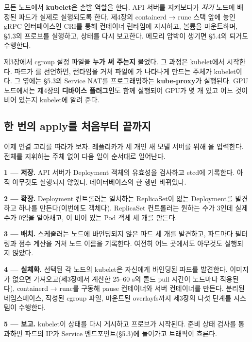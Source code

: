모든 노드에서 \textbf{kubelet}은 손발 역할을 한다. API 서버를 지켜보다가 \textit{자기} 노드에 배정된 파드가 실제로 실행되도록 한다. 제4장의 containerd → runc 스택 앞에 놓인 gRPC 인터페이스인 CRI를 통해 컨테이너 런타임에 지시하고, 볼륨을 마운트하며, §5.3의 프로브를 실행하고, 상태를 다시 보고한다. 메모리 압박이 생기면 §5.4의 퇴거도 수행한다.

제3장에서 cgroup 설정 파일을 \textbf{누가 써 주는지} 물었다. 그 과정은 kubelet에서 시작한다. 파드가 를 선언하면, 런타임을 거쳐  파일에 가 나타나게 만드는 주체가 kubelet이다. 그 옆에는 §5.3의 Service NAT를 프로그래밍하는 \textbf{kube-proxy}가 실행된다. GPU 노드에서는 제4장의 \textbf{디바이스 플러그인}도 함께 실행되어 GPU가 몇 개 있고 어느 것이 비어 있는지 kubelet에 알려 준다.

\subsection*{한 번의 apply를 처음부터 끝까지}

이제 연결 고리를 따라가 보자. 레플리카가 세 개인 새 모델 서버를 위해 을 입력한다. 전체를 지휘하는 주체 없이 다음 일이 순서대로 일어난다.

\begin{tbbitemize}
  \item \textbf{1 — 저장.} API 서버가 Deployment 객체의 유효성을 검사하고 etcd에 기록한다. 아직 아무것도 실행되지 않았다. 데이터베이스의 한 행만 바뀌었다.
  \item \textbf{2 — 확장.} Deployment 컨트롤러는 일치하는 ReplicaSet이 없는 Deployment를 발견하고 하나를 만든다(이번에도 객체다). ReplicaSet 컨트롤러는 원하는 수가 3인데 실제 수가 0임을 알아채고, 이 비어 있는 Pod 객체 세 개를 만든다.
  \item \textbf{3 — 배치.} 스케줄러는 노드에 바인딩되지 않은 파드 세 개를 발견하고, 파드마다 필터링과 점수 계산을 거쳐 노드 이름을 기록한다. 여전히 어느 곳에서도 아무것도 실행되지 않았다.
  \item \textbf{4 — 실체화.} 선택된 각 노드의 kubelet은 자신에게 바인딩된 파드를 발견한다. 이미지가 없으면 가져오고(제3장에서 계산한 25–60 s의 콜드 pull 시간이 노드마다 적용된다), containerd → runc를 구동해 pause 컨테이너와 서버 컨테이너를 만든다. 분리된 네임스페이스, 작성된 cgroup 파일, 마운트된 overlayfs까지 제3장의 다섯 단계를 시스템이 수행한다.
  \item \textbf{5 — 보고.} kubelet이 상태를 다시 게시하고 프로브가 시작된다. 준비 상태 검사를 통과하면 파드의 IP가 Service 엔드포인트(§5.3)에 들어가고 트래픽이 흐른다.
\end{tbbitemize}

